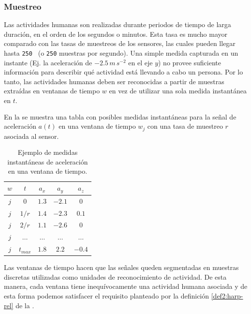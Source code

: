 \subsubsection{Muestreo}

\label{ssec44:sampling}Las actividades humanas son realizadas durante
periodos de tiempo de larga duración, en el orden de los segundos
o minutos. Esta tasa es mucho mayor comparado con las tasas de muestreos
de los sensores, las cuales pueden llegar hasta \texttt{250 }
(o \texttt{250} muestras por segundo). Una simple medida capturada
en un instante (Ej. la aceleración de $-2.5\,m\,s^{-2}$ en el eje
$y$) no provee suficiente información para describir qué actividad
está llevando a cabo un persona. Por lo tanto, las actividades humanas
deben ser reconocidas a partir de muestras extraídas en ventanas de
tiempo $w$ en vez de utilizar una sola medida instantánea en $t$. 

En la  se muestra una tabla con posibles medidas
instantáneas para la señal de aceleración $a(t)$ en una ventana de
tiempo $w_{j}$ con una tasa de muestreo $r$ asociada al sensor.

\begin{table}[!tbph]
\begin{centering}
\begin{tabular}{|c|c|c|c|c|}
\hline 
$w$ & $t$ & $a_{x}$ & $a_{y}$ & $a_{z}$\tabularnewline
\hline 
\hline 
$j$ & $0$ & \texttt{$1.3$} & \texttt{$-2.1$} & \texttt{$0$}\tabularnewline
\hline 
$j$ & $1/r$ & \texttt{$1.4$} & \texttt{$-2.3$} & \texttt{$0.1$}\tabularnewline
\hline 
$j$ & $2/r$ & \texttt{$1.1$} & \texttt{$-2.6$} & \texttt{$0$}\tabularnewline
\hline 
$j$ & $\ldots$ & \texttt{$\ldots$} & \texttt{$\ldots$} & \texttt{$\ldots$}\tabularnewline
\hline 
$j$ & $t_{max}$ & \texttt{$1.8$} & \texttt{$2.2$} & \texttt{$-0.4$}\tabularnewline
\hline 
\end{tabular}
\par\end{centering}
\caption[Medidas instantáneas de aceleración ]{\label{tab4:ex-signal}Ejemplo de medidas instantáneas de aceleración
en una ventana de tiempo.}
\end{table}

Las ventanas de tiempo hacen que las señales queden segmentadas en
muestras discretas utilizadas como unidades de reconocimiento de actividad.
De esta manera, cada ventana tiene inequívocamente una actividad humana
asociada y de esta forma podemos satisfacer el requisito planteado
por la definición \ref{def2:harp-rel} de la . 

